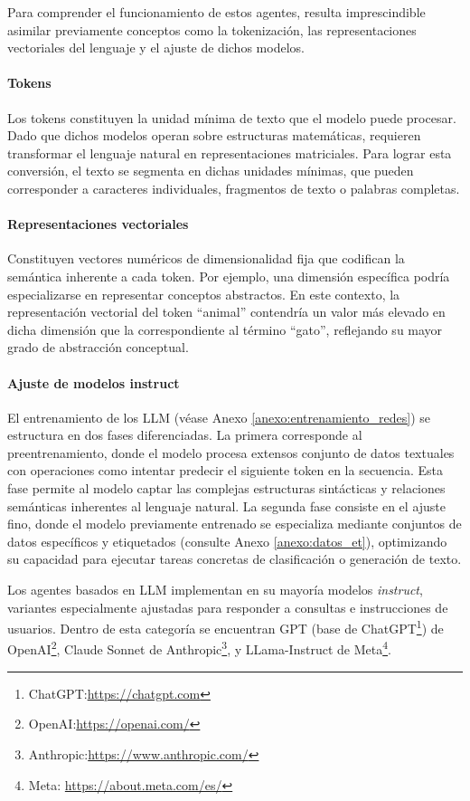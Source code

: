 Para comprender el funcionamiento de estos agentes, resulta imprescindible asimilar previamente conceptos como la tokenización, las representaciones vectoriales del lenguaje y el ajuste de dichos modelos.

\paragraph{Tokens}\label{token}
Los tokens constituyen la unidad mínima de texto que el modelo puede procesar. Dado que dichos modelos operan sobre estructuras matemáticas, requieren transformar el lenguaje natural en representaciones matriciales. Para lograr esta conversión, el texto se segmenta en dichas unidades mínimas, que pueden corresponder a caracteres individuales, fragmentos de texto o palabras completas. 

\paragraph{Representaciones vectoriales}
Constituyen vectores numéricos de dimensionalidad fija que codifican la semántica inherente a cada token. Por ejemplo, una dimensión específica podría especializarse en representar conceptos abstractos. En este contexto, la representación vectorial del token ``animal'' contendría un valor más elevado en dicha dimensión que la correspondiente al término ``gato'', reflejando su mayor grado de abstracción conceptual.

\paragraph{Ajuste de modelos instruct}
El entrenamiento de los LLM (véase Anexo \ref{anexo:entrenamiento_redes}) se estructura en dos fases diferenciadas. La primera corresponde al preentrenamiento, donde el modelo procesa extensos conjunto de datos textuales con operaciones como intentar predecir el siguiente token en la secuencia. Esta fase permite al modelo captar las complejas estructuras sintácticas y relaciones semánticas inherentes al lenguaje natural. La segunda fase consiste en el ajuste fino, donde el modelo previamente entrenado se especializa mediante conjuntos de datos específicos y etiquetados (consulte Anexo \ref{anexo:datos_et}), optimizando su capacidad para ejecutar tareas concretas de clasificación o generación de texto.

Los agentes basados en LLM implementan en su mayoría modelos \textit{instruct}, variantes especialmente ajustadas para responder a consultas e instrucciones de usuarios. Dentro de esta categoría se encuentran GPT (base de ChatGPT\footnote{ChatGPT:\url{https://chatgpt.com}}) de OpenAI\footnote{OpenAI:\url{https://openai.com/}}, Claude Sonnet de Anthropic\footnote{Anthropic:\url{https://www.anthropic.com/}}, y LLama-Instruct de Meta\footnote{Meta: \url{https://about.meta.com/es/}}.



